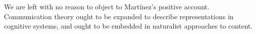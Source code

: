 We are left with no reason to object to Mart\'{i}nez's positive account.
Communication theory ought to be expanded to describe representations in cognitive systems, and ought to be embedded in naturalist approaches to content.


